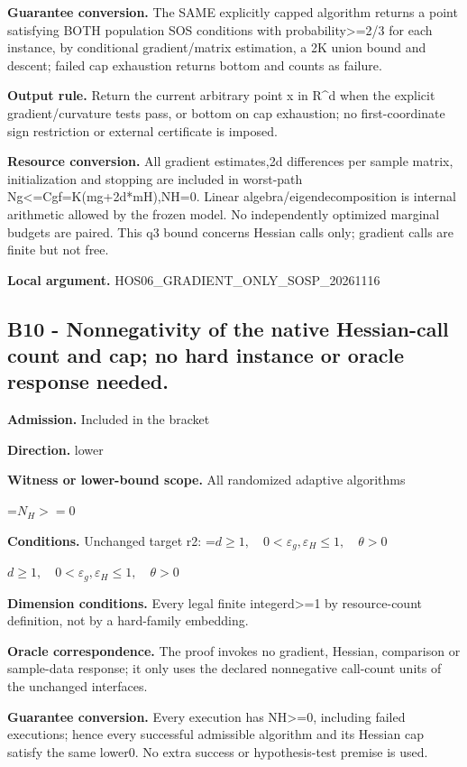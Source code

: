 \documentclass[10pt,a4paper]{article}
\newcommand{\AtlasMath}[1]{\par\begingroup\centering\setbox0=\hbox{$\displaystyle #1$}\ifdim\wd0>1.4\linewidth\typeout{ATLAS WIDE FORMULA: \the\wd0}\fi\ifdim\wd0>\linewidth\resizebox{\linewidth}{!}{\box0}\else\box0\fi\par\endgroup}
\newcommand{\AtlasInlineMath}[1]{\begingroup\setbox0=\hbox{$#1$}\ifdim\wd0>.4\linewidth\endgroup\AtlasMath{#1}\else\endgroup$#1$\fi}
\begin{document}
\textbf{Guarantee conversion.} The SAME explicitly capped algorithm returns a point satisfying BOTH population SOS conditions with probability>=2/3 for each instance, by conditional gradient/matrix estimation, a 2K union bound and descent; failed cap exhaustion returns bottom and counts as failure.

\textbf{Output rule.} Return the current arbitrary point x in R\textasciicircum{}d when the explicit gradient/curvature tests pass, or bottom on cap exhaustion; no first-coordinate sign restriction or external certificate is imposed.

\textbf{Resource conversion.} All gradient estimates,2d differences per sample matrix, initialization and stopping are included in worst-path Ng<=Cgf=K(mg+2d*mH),NH=0. Linear algebra/eigendecomposition is internal arithmetic allowed by the frozen model. No independently optimized marginal budgets are paired. This q3 bound concerns Hessian calls only; gradient calls are finite but not free.

\textbf{Local argument.} HOS06\_\allowbreak{}GRADIENT\_\allowbreak{}ONLY\_\allowbreak{}SOSP\_\allowbreak{}20261116

\subsection{B10 - Nonnegativity of the native Hessian-call count and cap; no hard instance or oracle response needed.}
\textbf{Admission.} Included in the bracket

\textbf{Direction.} lower

\textbf{Witness or lower-bound scope.} All randomized adaptive algorithms

\AtlasMath{N_H>=0}
\textbf{Conditions.} Unchanged target r2: \AtlasInlineMath{d\ge1,\quad0<\varepsilon_g,\varepsilon_H\le1,\quad\theta>0}

\textbf{Dimension conditions.} Every legal finite integerd>=1 by resource-count definition, not by a hard-family embedding.

\textbf{Oracle correspondence.} The proof invokes no gradient, Hessian, comparison or sample-data response; it only uses the declared nonnegative call-count units of the unchanged interfaces.

\textbf{Guarantee conversion.} Every execution has NH>=0, including failed executions; hence every successful admissible algorithm and its Hessian cap satisfy the same lower0. No extra success or hypothesis-test premise is used.
\end{document}
